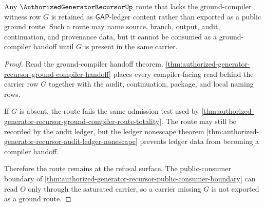\begin{theorem}
\label{thm:authorized-generator-recursor-ground-route-refusal-surface}
Any $\AuthorizedGeneratorRecursorUp$ route that lacks the ground-compiler witness row $G$ is retained as $\mathsf{GAP}$-ledger content rather than exported as a public ground route. Such a route may name source, branch, output, audit, continuation, and provenance data, but it cannot be consumed as a ground-compiler handoff until $G$ is present in the same carrier.
\end{theorem}
\begin{proof}
Read the ground-compiler handoff theorem. \autoref{thm:authorized-generator-recursor-ground-compiler-handoff} places every compiler-facing read behind the carrier row $G$ together with the audit, continuation, package, and local naming rows.

If $G$ is absent, the route fails the same admission test used by \autoref{thm:authorized-generator-recursor-ground-compiler-route-totality}. The route may still be recorded by the audit ledger, but the ledger nonescape theorem \autoref{thm:authorized-generator-recursor-audit-ledger-nonescape} prevents ledger data from becoming a compiler handoff.

Therefore the route remains at the refusal surface. The public-consumer boundary of \autoref{thm:authorized-generator-recursor-public-consumer-boundary} can read $O$ only through the saturated carrier, so a carrier missing $G$ is not exported as a ground route.
\end{proof}

